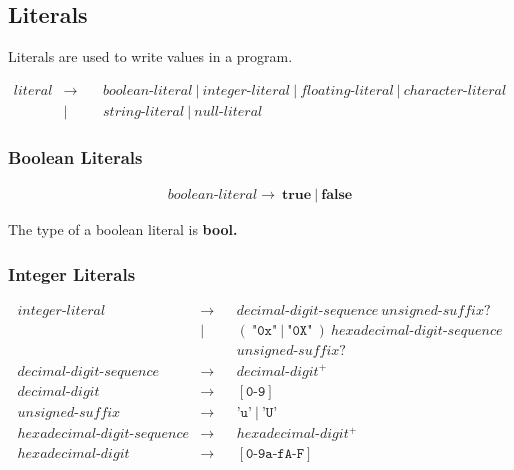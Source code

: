 \documentclass[a4paper,oneside,11pt]{article}
\begin{document}
\subsection{Literals}\label{literal}

Literals are used to write values in a program.

\begin{align*}
literal &\rightarrow \> & &\hyperref[booleanliteral]{boolean\textrm{-}literal} \> | \> \hyperref[integerliteral]{integer\textrm{-}literal} \> | \>
\hyperref[floatingliteral]{floating\textrm{-}literal} \> | \> \hyperref[characterliteral]{character\textrm{-}literal}\\
&| & &\hyperref[stringliteral]{string\textrm{-}literal} \> | \> \hyperref[nullliteral]{null\textrm{-}literal}
\end{align*}

\subsubsection{Boolean Literals}\label{booleanliteral}

\begin{align*}
boolean\textrm{-}literal \rightarrow \> \textbf{true} \> | \> \textbf{false}
\end{align*}

The type of a boolean literal is \bf{bool}.

\subsubsection{Integer Literals}\label{integerliteral}\label{decimaldigitsequence}\label{hexadecimaldigitsequence}

\begin{align*}
integer\textrm{-}literal &\rightarrow & &decimal\textrm{-}digit\textrm{-}sequence \> unsigned\textrm{-}suffix?\\
&| & &(\> \texttt{"0x"} \> | \> \texttt{"0X"} \>) \> hexadecimal\textrm{-}digit\textrm{-}sequence\\
& & &unsigned\textrm{-}suffix?\\
decimal\textrm{-}digit\textrm{-}sequence &\rightarrow & &decimal\textrm{-}digit^+\\
decimal\textrm{-}digit &\rightarrow & &[\texttt{0-9}]\\
unsigned\textrm{-}suffix &\rightarrow & &\texttt{'u'} \> | \> \texttt{'U'}\\
hexadecimal\textrm{-}digit\textrm{-}sequence &\rightarrow & &hexadecimal\textrm{-}digit^+\\
hexadecimal\textrm{-}digit &\rightarrow & &[\texttt{0-9a-fA-F}]
\end{align*}
\end{document}
